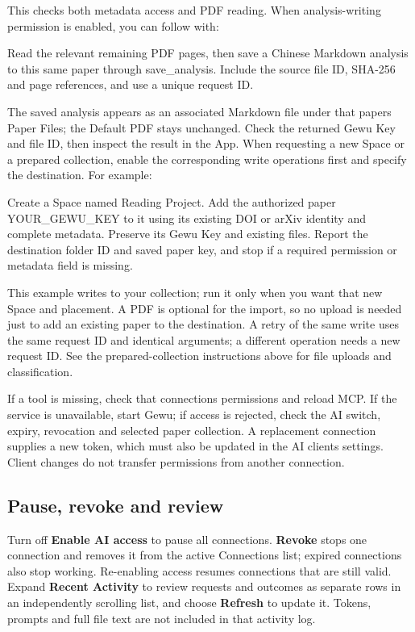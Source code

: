 \documentclass[10pt,letterpaper,oneside]{scrreprt}
\renewenvironment{quote}
  {\Needspace{5\baselineskip}\begin{tcolorbox}[enhanced,breakable,colback=GewuPale,colframe=GewuPale,boxrule=0pt,
    borderline west={1.6pt}{0pt}{GewuBlue},arc=1.2mm,left=2.5mm,right=2.5mm,top=1.7mm,bottom=1.7mm,
    before skip=4pt,after skip=5pt,fontupper=\color{GewuInk}\small]}
  {\end{tcolorbox}}
\begin{document}
This checks both metadata access and PDF reading. When analysis-writing permission is enabled, you can follow with:

\begin{quote}
Read the relevant remaining PDF pages, then save a Chinese Markdown analysis to this same paper through save\_analysis. Include the source file ID, SHA-256 and page references, and use a unique request ID.
\end{quote}

The saved analysis appears as an associated Markdown file under that paper\textquotesingle s Paper Files; the Default PDF stays unchanged. Check the returned Gewu Key and file ID, then inspect the result in the App. When requesting a new Space or a prepared collection, enable the corresponding write operations first and specify the destination. For example:

\begin{quote}
Create a Space named Reading Project. Add the authorized paper YOUR\_GEWU\_KEY to it using its existing DOI or arXiv identity and complete metadata. Preserve its Gewu Key and existing files. Report the destination folder ID and saved paper key, and stop if a required permission or metadata field is missing.
\end{quote}

This example writes to your collection; run it only when you want that new Space and placement. A PDF is optional for the import, so no upload is needed just to add an existing paper to the destination. A retry of the same write uses the same request ID and identical arguments; a different operation needs a new request ID. See the prepared-collection instructions above for file uploads and classification.

If a tool is missing, check that connection\textquotesingle s permissions and reload MCP. If the service is unavailable, start Gewu; if access is rejected, check the AI switch, expiry, revocation and selected paper collection. A replacement connection supplies a new token, which must also be updated in the AI client\textquotesingle s settings. Client changes do not transfer permissions from another connection.

\subsection{Pause, revoke and review}\label{pause-revoke-and-review}

Turn off \textbf{Enable AI access} to pause all connections. \textbf{Revoke} stops one connection and removes it from the active Connections list; expired connections also stop working. Re-enabling access resumes connections that are still valid. Expand \textbf{Recent Activity} to review requests and outcomes as separate rows in an independently scrolling list, and choose \textbf{Refresh} to update it. Tokens, prompts and full file text are not included in that activity log.
\end{document}
